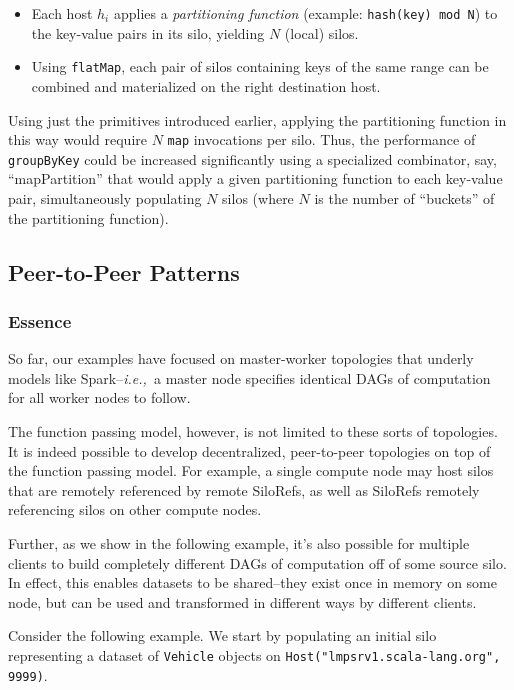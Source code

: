 \documentclass{jfp1}
\newcommand{\ie}{{\em i.e.,~}}
\begin{document}
\begin{itemize}
\item Each host $h_i$ applies a {\em partitioning function} (example:
  \texttt{hash(key) mod N}) to the key-value pairs in its silo, yielding $N$
  (local) silos.

\item Using \verb|flatMap|, each pair of silos containing keys of the same
  range can be combined and materialized on the right destination host.
\end{itemize}

Using just the primitives introduced earlier, applying the partitioning
function in this way would require $N$ \verb|map| invocations per silo. Thus,
the performance of \verb|groupByKey| could be increased significantly using a
specialized combinator, say, ``mapPartition'' that would apply a given
partitioning function to each key-value pair, simultaneously populating $N$
silos (where $N$ is the number of ``buckets'' of the partitioning function).

\subsection{Peer-to-Peer Patterns}
\label{sec:decentral}

\subsubsection{Essence}

So far, our examples have focused on master-worker topologies that underly
models like Spark--\ie a master node specifies identical DAGs of computation for
all worker nodes to follow.

The function passing model, however, is not limited to these sorts of
topologies. It is indeed possible to develop decentralized, peer-to-peer
topologies on top of the function passing model. For example, a single compute
node may host silos that are remotely referenced by remote SiloRefs, as well as
SiloRefs remotely referencing silos on other compute nodes.

Further, as we show in the following example, it's also possible for multiple
clients to build completely different DAGs of computation off of some source
silo. In effect, this enables datasets to be shared--they exist once in memory
on some node, but can be used and transformed in different ways by different
clients.

Consider the following example. We start by populating an initial silo
representing a dataset of \verb|Vehicle| objects on
\verb|Host("lmpsrv1.scala-lang.org", 9999)|.
\end{document}
